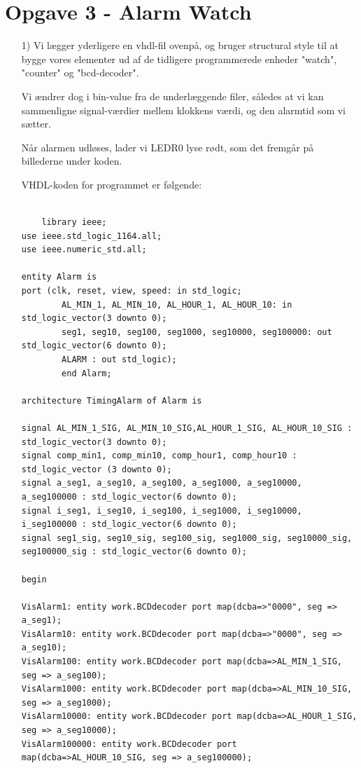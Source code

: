 \section{Opgave 3 - Alarm Watch}
\begin{enumerate}
	\item[1)]
	Vi lægger yderligere en vhdl-fil ovenpå, og bruger structural style til at bygge vores elementer ud af de tidligere programmerede enheder "watch", "counter" og "bcd-decoder". 
	
	Vi ændrer dog i bin-value fra de underlæggende filer, således at vi kan sammenligne signal-værdier mellem klokkens værdi, og den alarmtid som vi sætter. 
	
	Når alarmen udløses, lader vi LEDR0 lyse rødt, som det fremgår på billederne under koden.

	VHDL-koden for programmet er følgende:
	
	\begin{lstlisting}[caption={Koden for øverste lag af Alarm Watch},label={lst:alarmWatch}]
		
	library ieee;
use ieee.std_logic_1164.all;
use ieee.numeric_std.all;

entity Alarm is
port (clk, reset, view, speed: in std_logic;
		AL_MIN_1, AL_MIN_10, AL_HOUR_1, AL_HOUR_10: in std_logic_vector(3 downto 0);
		seg1, seg10, seg100, seg1000, seg10000, seg100000: out std_logic_vector(6 downto 0);
		ALARM : out std_logic);
		end Alarm;
		
architecture TimingAlarm of Alarm is

signal AL_MIN_1_SIG, AL_MIN_10_SIG,AL_HOUR_1_SIG, AL_HOUR_10_SIG : std_logic_vector(3 downto 0);
signal comp_min1, comp_min10, comp_hour1, comp_hour10 : std_logic_vector (3 downto 0);
signal a_seg1, a_seg10, a_seg100, a_seg1000, a_seg10000, a_seg100000 : std_logic_vector(6 downto 0);
signal i_seg1, i_seg10, i_seg100, i_seg1000, i_seg10000, i_seg100000 : std_logic_vector(6 downto 0);
signal seg1_sig, seg10_sig, seg100_sig, seg1000_sig, seg10000_sig, seg100000_sig : std_logic_vector(6 downto 0);

begin

VisAlarm1: entity work.BCDdecoder port map(dcba=>"0000", seg => a_seg1);
VisAlarm10: entity work.BCDdecoder port map(dcba=>"0000", seg => a_seg10);
VisAlarm100: entity work.BCDdecoder port map(dcba=>AL_MIN_1_SIG, seg => a_seg100);
VisAlarm1000: entity work.BCDdecoder port map(dcba=>AL_MIN_10_SIG, seg => a_seg1000);
VisAlarm10000: entity work.BCDdecoder port map(dcba=>AL_HOUR_1_SIG, seg => a_seg10000);
VisAlarm100000: entity work.BCDdecoder port map(dcba=>AL_HOUR_10_SIG, seg => a_seg100000);


\end{lstlisting}
\end{enumerate}
